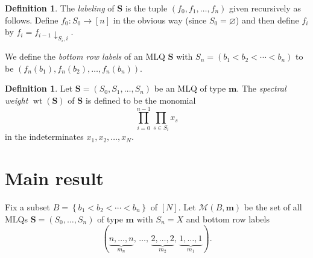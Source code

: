 \documentclass[reqno]{amsart}
\newcommand{\fs}{\mathcal{S}} %
\newcommand{\0}{\phantom{c}}
\DeclareMathOperator{\wt}{wt} %
\newcommand{\xx}{\mathbf{x}}
\newcommand{\mm}{\mathbf{m}}
\newcommand{\MLQ}{\mathbf{S}}
\newcommand{\mcF}{\mathcal{F}}
\newcommand{\mcM}{\mathcal{M}}
\let\sumnonlimits\sum
\let\prodnonlimits\prod
\renewcommand{\sum}{\sumnonlimits\limits}
\renewcommand{\prod}{\prodnonlimits\limits}
\newcommand{\set}[1]{\left\{ #1 \right\}}
\newcommand{\tup}[1]{\left( #1 \right)}
\newcommand{\ive}[1]{\left[ #1 \right]}
\newcommand{\defn}[1]{{\color{darkred}\emph{#1}}} %
\theoremstyle{plain}
\theoremstyle{definition}
\newtheorem{dfn}[thm]{Definition}
\numberwithin{equation}{section}
\begin{document}
\begin{dfn}
The \defn{labeling} of $\MLQ$ is the tuple $(f_0, f_1, \dotsc, f_n)$ given recursively as follows.
Define $f_0 \colon S_0 \to \ive{n}$ in the obvious way (since $S_0 = \varnothing$) and then define $f_i$ by $f_i = f_{i-1} \downarrow_{S_i, i}$.

We define the \defn{bottom row labels} of an MLQ $\MLQ$ with $S_n = (b_1 < b_2 < \cdots < b_n)$ to be $\tup{f_n(b_1), f_n(b_2), \dotsc, f_n(b_n)}$.
\end{dfn}

\begin{dfn} \label{def.mlq.sw}
Let $\MLQ = \tup{S_0, S_1, \ldots, S_n}$ be an MLQ of type $\mm$.
The \defn{spectral weight} $\wt\tup{\MLQ}$
of $\MLQ$ is defined to be the monomial
\[
 \prod_{i=0}^{n-1} \prod_{s \in S_i} x_s
\]
in the indeterminates $x_1, x_2, \ldots, x_N$.
\end{dfn}


%








\section{Main result}
\label{sec:result}


Fix a subset $B = \set{b_1 < b_2 < \cdots < b_n}$ of $\ive{N}$.
Let $\mcM \tup{B, \mm}$ be the set of all MLQs $\MLQ = (S_0, \dotsc, S_n)$ of type $\mm$
with $S_n = X$ and bottom row labels
\[
(\underbrace{n, \dotsc, n}_{m_n},\, \dotsc,\, \underbrace{2, \dotsc, 2}_{m_2},\, \underbrace{1, \dotsc, 1}_{m_1}).
\]
\end{document}
